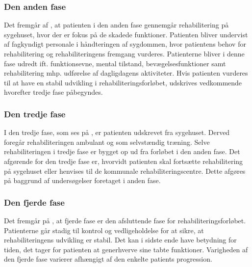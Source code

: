 \subsubsection{Den anden fase}
Det fremgår af , at patienten i den anden fase gennemgår rehabilitering på sygehuset, hvor der er fokus på de skadede funktioner. Patienten bliver undervist af fagkyndigt personale i håndteringen af sygdommen, hvor patientens behov for rehabilitering og rehabiliteringens fremgang vurderes. Patienterne bliver i denne fase udredt ift. funktionsevne, mental tilstand, bevægelsesfunktioner samt rehabilitering mhp. udførelse af dagligdagens aktiviteter. Hvis patienten vurderes til at have en stabil udvikling i rehabiliteringsforløbet, udskrives vedkommende hvorefter tredje fase påbegyndes. \cite{Sundhedsstyrelsen2011a}

\subsubsection{Den tredje fase}
I den tredje fase, som ses på , er patienten udskrevet fra sygehuset. Derved foregår rehabiliteringen ambulant og som selvstændig træning. Selve rehabiliteringen i tredje fase er bygget op ud fra forløbet i den anden fase. Det afgørende for den tredje fase er, hvorvidt patienten skal fortsætte rehabilitering på sygehuset eller henvises til de kommunale rehabiliteringscentre. Dette afgøres på baggrund af undersøgelser foretaget i anden fase. \cite{Sundhedsstyrelsen2011a}

\subsubsection{Den fjerde fase}
Det fremgår på , at fjerde fase er den afsluttende fase for rehabiliteringsforløbet. Patienterne går stadig til kontrol og vedligeholdelse for at sikre, at rehabiliteringens udvikling er stabil. Det kan i sidste ende have betydning for tiden, det tager for patienten at generhverve sine tabte funktioner. Varigheden af den fjerde fase varierer afhængigt af den enkelte patients progression. \cite{Sundhedsstyrelsen2011a} \\

